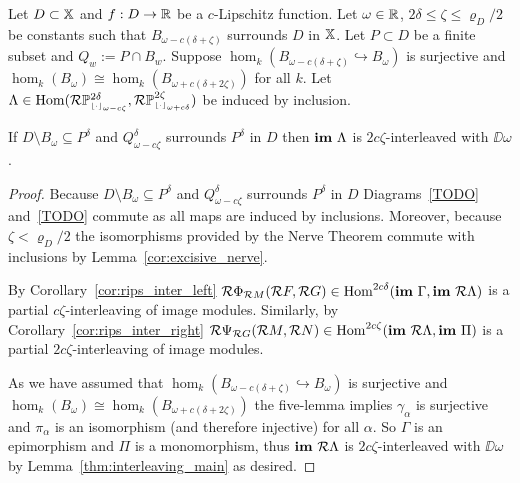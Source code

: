 \begin{theorem}
  Let $D\subset\mathbb{X}$ and $f : D\to\mathbb{R}$ be a $c$-Lipschitz function.
  Let $\omega\in\mathbb{R}$, $2\delta\leq\zeta\leq\varrho_D/2$ be constants such that $B_{\omega-c(\delta+\zeta)}$ surrounds $D$ in $\mathbb{X}$.
  Let $P\subset D$ be a finite subset and $Q_w := P\cap B_w$.
  Suppose $\hom_k(B_{\omega-c(\delta+\zeta)}\hookrightarrow B_\omega)$ is surjective and $\hom_k(B_\omega)\cong\hom_k(B_{\omega+c(\delta+2\zeta)})$ for all $k$.
  Let $\Lambda\in\mathrm{Hom}(\mathcal{R}\mathbb{P}_{\scriptscriptstyle \lfloor\cdot\rfloor_{\omega-c\zeta}}^{2\delta}, \mathcal{R}\mathbb{P}_{\scriptscriptstyle \lfloor\cdot\rfloor_{\omega+c\delta}}^{2\zeta})$ be induced by inclusion.

  If $D\setminus B_\omega\subseteq P^\delta$ and $Q_{\omega-c\zeta}^\delta$ surrounds $P^\delta$ in $D$ then $\mathbf{im}~\Lambda$ is $2c\zeta$-interleaved with $\DD{\omega}$.
\end{theorem}
\begin{proof}
  Because $D\setminus B_\omega\subseteq P^\delta$ and $Q_{\omega-c\zeta}^\delta$ surrounds $P^\delta$ in $D$ Diagrams~\ref{TODO} and~\ref{TODO} commute as all maps are induced by inclusions.
  Moreover, because $\zeta < \varrho_D/2$ the isomorphisms provided by the Nerve Theorem commute with inclusions by Lemma~\ref{cor:excisive_nerve}.

  By Corollary~\ref{cor:rips_inter_left} $\mathcal{R} \Phi_{\mathcal{R} M}(\mathcal{R} F, \mathcal{R} G)\in\mathrm{Hom}^{2c\delta}(\mathbf{im}~\Gamma,\mathbf{im}~\mathcal{R}\Lambda)$ is a partial $c\zeta$-interleaving of image modules.
  Similarly, by Corollary~\ref{cor:rips_inter_right} $\mathcal{R} \Psi_{\mathcal{R} G} (\mathcal{R} M,\mathcal{R} N)\in\mathrm{Hom}^{2c\zeta}(\mathbf{im}~\mathcal{R}\Lambda, \mathbf{im}~\Pi)$ is a partial $2c\zeta$-interleaving of image modules.

  As we have assumed that $\hom_k(B_{\omega-c(\delta+\zeta)}\hookrightarrow B_\omega)$ is surjective and $\hom_k(B_\omega)\cong\hom_k(B_{\omega+c(\delta+2\zeta)})$ the five-lemma implies $\gamma_\alpha$ is surjective and $\pi_\alpha$ is an isomorphism (and therefore injective) for all $\alpha$.
  So $\Gamma$ is an epimorphism and $\Pi$ is a monomorphism, thus $\mathbf{im}~\mathcal{R}\Lambda$ is $2c\zeta$-interleaved with $\DD{\omega}$ by Lemma~\ref{thm:interleaving_main} as desired.
\end{proof}
